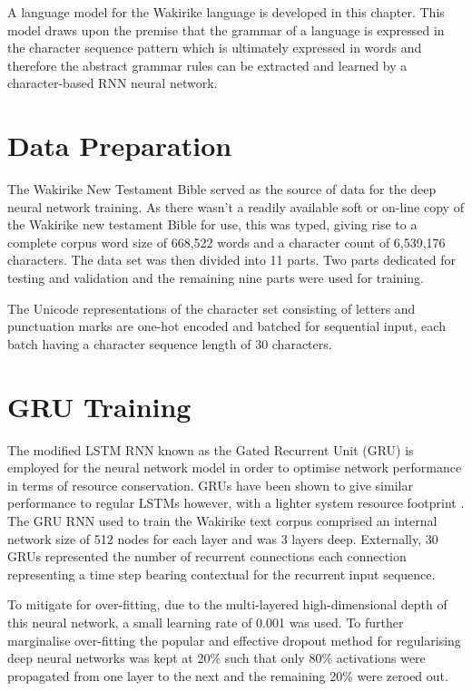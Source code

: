 A language model for the Wakirike language is developed in this chapter.  This model draws upon the premise that the grammar of a language is expressed in the character sequence pattern which is ultimately expressed in words and therefore the abstract grammar rules can be extracted and learned by a character-based RNN neural network.

\section{Data Preparation}
The Wakirike New Testament Bible served as the source of data for the deep neural network training.  As there wasn't a readily available soft or on-line copy of the Wakirike new testament Bible for use, this was typed, giving rise to a complete corpus word size of 668,522 words and a character count of 6,539,176 characters. The data set was then divided into 11 parts. Two parts dedicated for testing and validation and the remaining nine parts were used for training.

The Unicode representations of the character set consisting of letters and punctuation marks are one-hot encoded and batched for sequential input, each batch having a character sequence length of 30 characters.


\section{GRU Training}

The modified LSTM RNN known as the Gated Recurrent Unit (GRU) is employed for the neural network model in order to optimise network performance in terms of resource conservation.  GRUs have been shown to give similar performance to regular LSTMs however, with a lighter system resource footprint \citep{cho2014learning}. The GRU RNN used to train the Wakirike text corpus comprised an internal network size of 512 nodes for each layer and was 3 layers deep. Externally, 30 GRUs represented  the number of recurrent connections each connection representing a time step bearing contextual for the recurrent input sequence. 

To mitigate for over-fitting, due to the multi-layered high-dimensional depth of this neural network, a small learning rate of 0.001 was used. To further marginalise over-fitting the popular and effective dropout method \citep{srivastava2014dropout} for regularising deep neural networks was kept at 20\% such that only 80\% activations were propagated from one layer to the next and the remaining 20\% were zeroed out.

